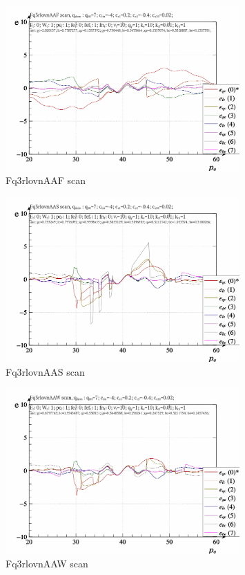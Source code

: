 \documentclass[a4paper,10pt]{article}
\begin{document}
\begin{figure}[htb!]
  \centerline{
    \includegraphics[width=0.8\textwidth]{qls-p_p_e_Fq3rlovnAAF_scan.png}
  }
  \caption{Fq3rlovnAAF scan}
  \label{atu:f:Fq3rlovnAAF_scan}
\end{figure}

\begin{figure}[htb!]
  \centerline{
    \includegraphics[width=0.8\textwidth]{qls-p_p_e_Fq3rlovnAAS_scan.png}
  }
  \caption{Fq3rlovnAAS scan}
  \label{atu:f:Fq3rlovnAAS_scan}
\end{figure}

\begin{figure}[htb!]
  \centerline{
    \includegraphics[width=0.8\textwidth]{qls-p_p_e_Fq3rlovnAAW_scan.png}
  }
  \caption{Fq3rlovnAAW scan}
  \label{atu:f:Fq3rlovnAAW_scan}
\end{figure}
\end{document}
